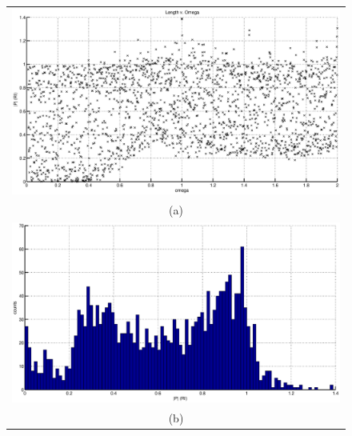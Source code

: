 \documentclass[a4paper,11pt]{article}
\begin{document}
\begin{figure}[ht]
\label{fig:}
\begin{tabular}{c}
\includegraphics[scale=0.45]{Figure5_altA.eps}\\
(a) \\[6pt]
\includegraphics[scale=0.45]{Figure5_histA.eps}\\
(b) \\[6pt]
\end{tabular}
\end{figure}
\end{document}
